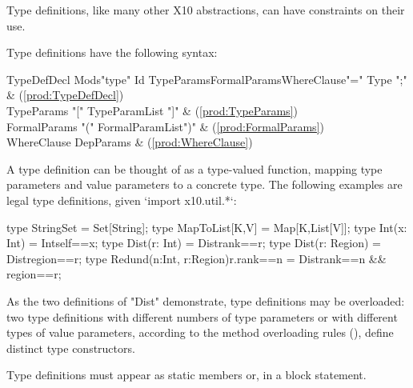Type definitions, like many other X10 abstractions, can have constraints on
their use. 
\begin{xten}

\end{xten}


Type definitions have the following syntax:

\begin{bbgrammar}
 TypeDefDecl    \: Mods\opt \xcd"type" Id TypeParams\opt FormalParams\opt WhereClause\opt \xcd"=" Type \xcd";" & (\ref{prod:TypeDefDecl})\\%
 TypeParams    \: \xcd"[" TypeParamList \xcd"]" & (\ref{prod:TypeParams})\\%
 FormalParams    \: \xcd"(" FormalParamList\opt \xcd")" & (\ref{prod:FormalParams})\\%
 WhereClause    \: DepParams & (\ref{prod:WhereClause})\\%
\end{bbgrammar}


\noindent
A type definition can be thought of as a type-valued function,
mapping type parameters and value parameters to a concrete type.
%
The following examples are legal type definitions, given \xcd`import x10.util.*`:
\begin{xten}
type StringSet = Set[String];
type MapToList[K,V] = Map[K,List[V]];
type Int(x: Int) = Int{self==x};
type Dist(r: Int) = Dist{rank==r};
type Dist(r: Region) = Dist{region==r};
type Redund(n:Int, r:Region){r.rank==n} = Dist{rank==n && region==r};
\end{xten}
\label{TypeDefGuard}
As the two definitions of \xcd"Dist" demonstrate, type definitions may 
be overloaded: two type definitions with different numbers of type
parameters or with different types of value
parameters, according to the method overloading rules
(), define distinct type constructors.

Type definitions must appear as static members or, 
in a block statement.

